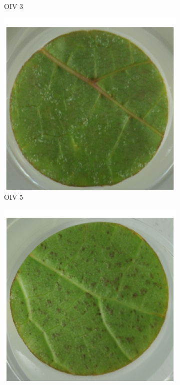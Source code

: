 \documentclass[english]{article}
\begin{document}
\begin{figure}[H]
\begin{subfigure}[b]{0.3\linewidth}
        \caption{OIV 3}\label{fig:oiv3}
    \end{subfigure}
    \begin{subfigure}[b]{0.3\linewidth}
        \includegraphics[width=\linewidth]{oiv5.png}
        \caption{OIV 5}\label{fig:oiv5}
    \end{subfigure}
    \begin{subfigure}[b]{0.3\linewidth}
        \includegraphics[width=\linewidth]{oiv7.png}

\end{subfigure}
\end{figure}
\end{document}
